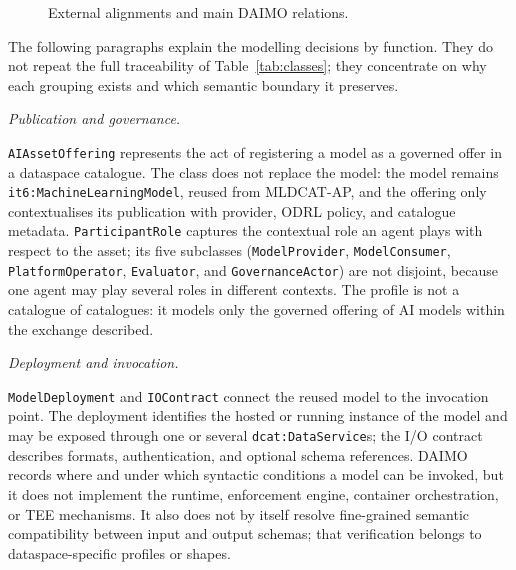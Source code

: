 \documentclass[Afour,sagev,times]{sagej}
\newcommand{\code}[1]{\texttt{#1}}
\begin{document}
\begin{figure}[tbp]
{
}
\caption{External alignments and main DAIMO relations.}
\label{fig:classes}
\end{figure}

The following paragraphs explain the modelling decisions by function. They do not repeat the full traceability of Table~\ref{tab:classes}; they concentrate on why each grouping exists and which semantic boundary it preserves.

\medskip\noindent\emph{Publication and governance.}\par\nobreak\noindent
\code{AIAssetOffering} represents the act of registering a model as a governed offer in a dataspace catalogue. The class does not replace the model: the model remains \code{it6:MachineLearningModel}, reused from MLDCAT-AP, and the offering only contextualises its publication with provider, ODRL policy, and catalogue metadata. \code{ParticipantRole} captures the contextual role an agent plays with respect to the asset; its five subclasses (\code{ModelProvider}, \code{ModelConsumer}, \code{PlatformOperator}, \code{Evaluator}, and \code{GovernanceActor}) are not disjoint, because one agent may play several roles in different contexts. The profile is not a catalogue of catalogues: it models only the governed offering of AI models within the exchange described.

\medskip\noindent\emph{Deployment and invocation.}\par\nobreak\noindent
\code{ModelDeployment} and \code{IOContract} connect the reused model to the invocation point. The deployment identifies the hosted or running instance of the model and may be exposed through one or several \code{dcat:DataService}s; the I/O contract describes formats, authentication, and optional schema references. DAIMO records where and under which syntactic conditions a model can be invoked, but it does not implement the runtime, enforcement engine, container orchestration, or TEE mechanisms. It also does not by itself resolve fine-grained semantic compatibility between input and output schemas; that verification belongs to dataspace-specific profiles or shapes.
\end{document}
